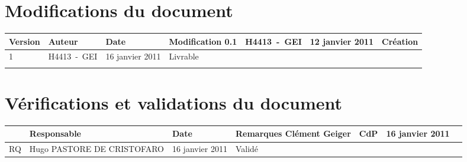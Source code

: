 
\section*{Modifications du document}

\begin{center}
\begin{longtable}{|m{14mm}||m{36mm}|m{36mm}|m{60mm}|}
\hline
Version & Auteur & Date & Modification\endhead \hline
0.1
& %
H4413~-~GEI
& %
12 janvier 2011
& %
Création
\\\hline
1
& %
H4413~-~GEI
& %
16 janvier 2011
& %
Livrable
\\\hline

& %

& %

& %

\\\hline
\end{longtable}
\end{center}


\section*{Vérifications et validations du document}

\begin{center}
\begin{longtable}{|m{15mm}|m{36mm}|m{36mm}|m{60mm}|}
\hline
 & Responsable & Date & Remarques\endhead \hline
Clément Geiger
& %
CdP
& %
16 janvier 2011
& %

\\\hline
RQ
& %
Hugo PASTORE DE CRISTOFARO
& %
16 janvier 2011
& %
Validé
\\\hline
\end{longtable}
\end{center}

\pagebreak
